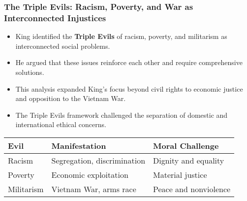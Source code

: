 \documentclass{beamer}
\begin{document}
	\begin{frame}
		\frametitle{The Triple Evils: Racism, Poverty, and War as Interconnected Injustices}
		
		\begin{itemize}
			\item King identified the \textbf{Triple Evils} of racism, poverty, and militarism as interconnected social problems.
			\item He argued that these issues reinforce each other and require comprehensive solutions.
			\item This analysis expanded King's focus beyond civil rights to economic justice and opposition to the Vietnam War.
			\item The Triple Evils framework challenged the separation of domestic and international ethical concerns.
		\end{itemize}
		
		\begin{table}
			\begin{tabular}{lll}
				\toprule
				\textbf{Evil} & \textbf{Manifestation} & \textbf{Moral Challenge} \\
				\midrule
				Racism & Segregation, discrimination & Dignity and equality \\
				Poverty & Economic exploitation & Material justice \\
				Militarism & Vietnam War, arms race & Peace and nonviolence \\
				\bottomrule
			\end{tabular}
		\end{table}
		
	\end{frame}
	
\end{document}
